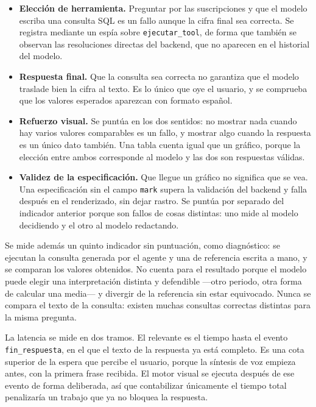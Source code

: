 \begin{itemize}
    \item \textbf{Elección de herramienta.} Preguntar por las suscripciones y
    que el modelo escriba una consulta SQL es un fallo aunque la cifra final sea
    correcta. Se registra mediante un espía sobre \texttt{ejecutar\_tool}, de
    forma que también se observan las resoluciones directas del backend, que no
    aparecen en el historial del modelo.

    \item \textbf{Respuesta final.} Que la consulta sea correcta no garantiza
    que el modelo traslade bien la cifra al texto. Es lo único que oye el
    usuario, y se comprueba que los valores esperados aparezcan con formato
    español.

    \item \textbf{Refuerzo visual.} Se puntúa en los dos sentidos: no mostrar
    nada cuando hay varios valores comparables es un fallo, y mostrar algo
    cuando la respuesta es un único dato también. Una tabla cuenta igual que un
    gráfico, porque la elección entre ambos corresponde al modelo y las dos son
    respuestas válidas.

    \item \textbf{Validez de la especificación.} Que llegue un gráfico no
    significa que se vea. Una especificación sin el campo \texttt{mark} supera
    la validación del backend y falla después en el renderizado, sin dejar
    rastro. Se puntúa por separado del indicador anterior porque son fallos de
    cosas distintas: uno mide al modelo decidiendo y el otro al modelo
    redactando.
\end{itemize}

Se mide además un quinto indicador sin puntuación, como diagnóstico: se ejecutan
la consulta generada por el agente y una de referencia escrita a mano, y se
comparan los valores obtenidos. No cuenta para el resultado porque el modelo
puede elegir una interpretación distinta y defendible —otro periodo, otra forma
de calcular una media— y divergir de la referencia sin estar equivocado. Nunca
se compara el texto de la consulta: existen muchas consultas correctas
distintas para la misma pregunta.

La latencia se mide en dos tramos. El relevante es el tiempo hasta el evento
\texttt{fin\_respuesta}, en el que el texto de la respuesta ya está completo. Es
una cota superior de la espera que percibe el usuario, porque la síntesis de voz
empieza antes, con la primera frase recibida. El motor visual se ejecuta después
de ese evento de forma deliberada, así que contabilizar únicamente el tiempo total
penalizaría un trabajo que ya no bloquea la respuesta.

